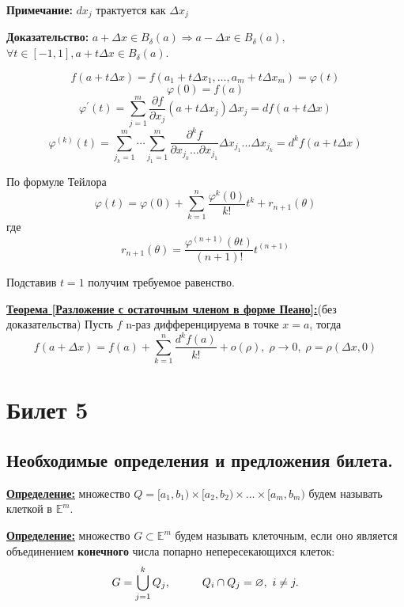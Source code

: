 \documentclass[a4paper,12pt]{article} %
\begin{document}
	\textbf{Примечание:} $dx_j$ трактуется как $\Delta x_j$
	\vspace{5mm}
	
	\textbf{Доказательство:} $a+\Delta x\in B_\delta(a) \Rightarrow a-\Delta x\in B_\delta(a), $ $\forall t\in[-1, 1], a+t\Delta x\in B_\delta(a)$.
	
	\[
	f(a + t\Delta x) = f(a_1 + t\Delta x_1, \dots, a_m + t\Delta x_m) = \varphi(t)
	\]
	\[
	\varphi(0) = f(a)
	\]
	\[
	\varphi^{'}(t) = \sum\limits_{j=1}^m \frac{\partial f}{\partial x_j}(a+t\Delta x_j)\Delta x_j = df(a+t\Delta x)
	\]
	\[
	\varphi^{(k)}(t) = \sum\limits_{j_k=1}^m\cdots\sum\limits_{j_1=1}^m\frac{\partial^kf}{\partial x_{j_k}\dots\partial x_{j_1}}\Delta x_{j_1}\dots \Delta x_{j_k} = d^kf(a+t\Delta x)
	\]
	
	По формуле Тейлора
	\[
	\varphi(t) = \varphi(0) +\sum\limits_{k=1}^n\frac{\varphi^k(0)}{k!}t^k + r_{n+1}(\theta)
	\]
	где
	\[
	r_{n+1}(\theta) = \frac{\varphi^{(n+1)}(\theta t)}{(n+1)!}t^{(n+1)}
	\]
	
	Подставив $t=1$ получим требуемое равенство.
	\vspace{5mm}
	
	\underline{\textbf{Теорема [Разложение с остаточным членом в форме Пеано]:}}(без доказательства) Пусть $f$ n-раз дифференцируема в точке $x =a$, тогда
	\[
	f(a+\Delta x) = f(a) + \sum\limits_{k=1}^n\frac{d^kf(a)}{k!}+o(\rho),  \; \rho\to 0, \; \rho =  \rho(\Delta x, 0)
	\]
	
	
	\newpage
	\section{Билет 5}
	
	\subsection{Необходимые определения и предложения билета.}
	
	\underline{\textbf{Определение:}} множество $Q = [a_1, b_1) \times [a_2, b_2) \times \dots \times [a_m, b_m)$ будем называть клеткой в $\mathbb{E}^m$.
	
	\vspace{3mm}
	
	\underline{\textbf{Определение:}} множество $G \subset \mathbb{E}^m$ будем называть клеточным, если оно является объединением \textbf{конечного} числа попарно непересекающихся клеток:
	\begin{equation*}
		G = \bigcup_{j = 1}^k Q_j, \hspace{10mm} Q_i \cap Q_j = \varnothing, \text{ }i \neq j.
	\end{equation*}
	
\end{document}

